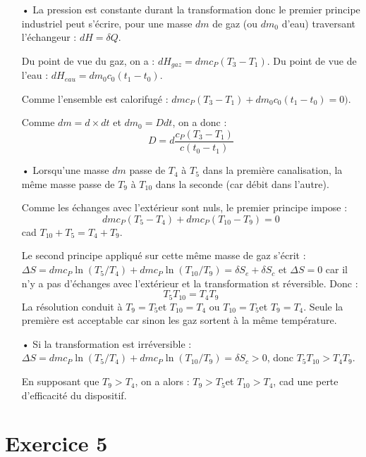 \documentclass{report}
\begin{document}
\begin{itemize}
\item[•] La pression est constante durant la transformation donc le premier principe industriel peut s'écrire, pour une masse $dm$ de gaz (ou $dm_0$ d'eau) traversant l'échangeur : $dH=\delta Q$.

Du point de vue du gaz, on a : $dH_{gaz}=dm c_P (T_3-T_1)$. 
Du point de vue de l'eau : $dH_{eau}=dm_0 c_0 (t_1-t_0)$. 

Comme l'ensemble est calorifugé : $dm c_P (T_3-T_1) + dm_0 c_0 (t_1-t_0)=0)$. 

Comme $dm=d\times dt$ et $dm_0=Ddt$, on a donc :
\begin{equation}
	D=d\frac{c_P(T_3-T_1)}{c(t_0-t_1)}
\end{equation}
	\item[•]Lorsqu'une masse $dm$ passe de $T_4$ à $T_5$ dans la première canalisation, la même masse passe de $T_9$ à $T_{10}$ dans la seconde (car débit dans l'autre).
	
	Comme les échanges avec l'extérieur sont nuls, le premier principe impose :
	\begin{equation}
		dmc_P(T_5-T_4) + dmc_P(T_{10}-T_9)=0
\end{equation}	 
cad $ T_{10} + T_5=T_4+T_9$.

Le second principe appliqué sur cette même masse de gaz s'écrit :
$\Delta S = dm c_P\ln(T_5/T_4)+dm c_P\ln(T_{10}/T_9)=\delta S_e + \delta S_c$ et $\Delta S=0$ car il n'y a pas d'échanges avec l'extérieur et la transformation st réversible. Donc :
\begin{equation}
	T_5T_{10}=T_4T_9
\end{equation}
La résolution conduit à $T_9=T_5$et $T_{10}=T_4$ ou $T_{10}=T_5$et $T_9=T_4$. Seule la première est acceptable car sinon les gaz sortent à la même température.

\item[•] Si la transformation est irréversible : $\Delta S = dm c_P\ln(T_5/T_4)+dm c_P\ln(T_{10}/T_9)= \delta S_c >0$, donc $T_5T_{10}>T_4T_9$.

En supposant que $T_9>T_4$, on a alors : $T_9>T_5$et $T_{10}>T_4$, cad une perte d'efficacité du dispositif.

\end{itemize}

\section*{Exercice 5}
\end{document}
